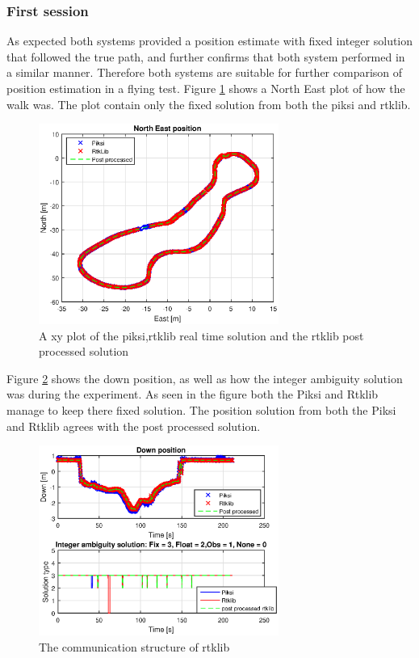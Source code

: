 \subsubsection{First session}
As expected both systems provided a position estimate with fixed integer solution that followed the true path, and further confirms that both system performed in a similar manner. Therefore both systems are suitable for further comparison of position estimation in a flying test.
Figure \ref{figure:xywalk1} shows a North East plot of how the walk was. The plot contain only the fixed solution from both the piksi and rtklib. 
\begin{figure}[H]
	\centering
		\includegraphics[width=0.7\textwidth]{figs/plots/xywalk1.eps}
		\caption{A xy plot of the piksi,rtklib real time solution and the rtklib post processed solution}
		\label{figure:xywalk1}
\end{figure}
Figure \ref{figure:DownAndAmbwalk1} shows the down position, as well as how the integer ambiguity solution was during the experiment. As seen in the figure both the Piksi and Rtklib manage to keep there fixed solution. The position solution from both the Piksi and Rtklib agrees with the post processed solution. 
\begin{figure}[H]
	\centering
		\includegraphics[width=0.7\textwidth]{figs/plots/downWalk1.eps}
		\caption{The communication structure of rtklib}
		\label{figure:DownAndAmbwalk1}
\end{figure}

